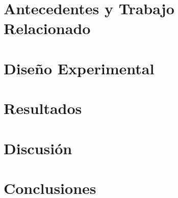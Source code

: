 \documentclass[runningheads]{llncs}
\begin{document}
%
\section{Antecedentes y Trabajo Relacionado}
\label{sec:background}


%
\section{Dise\~no Experimental}
\label{sec:design}


%
\section{Resultados}
\label{sec:results}


%
\section{Discusi\'on}
\label{sec:discussion}


%
\section{Conclusiones}
\label{sec:conclusions}
\end{document}

